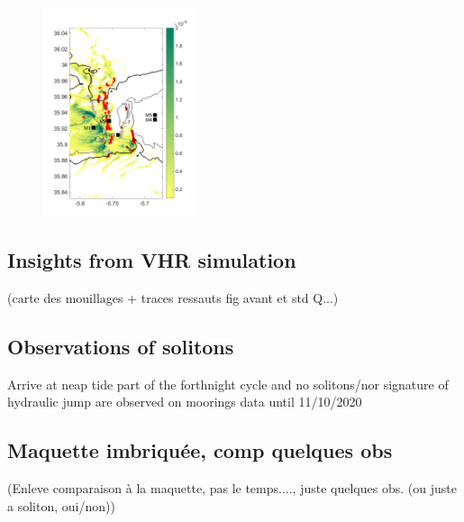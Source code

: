 \begin{figure}[!h]
 \includegraphics[width=0.4\textwidth]{./GBR3D/Fig_Moor.png}
 \caption {   }
\end{figure}


\subsection{Insights from VHR simulation}
(carte des mouillages + traces ressauts fig avant et std Q...)


\subsection{Observations of solitons}
Arrive at neap tide part of the forthnight cycle and no solitons/nor signature of hydraulic jump are observed on moorings data until 11/10/2020 



\subsection{Maquette imbriquée, comp quelques obs}

(Enleve comparaison à la maquette, pas le temps...., juste quelques obs. (ou juste a soliton, oui/non))
